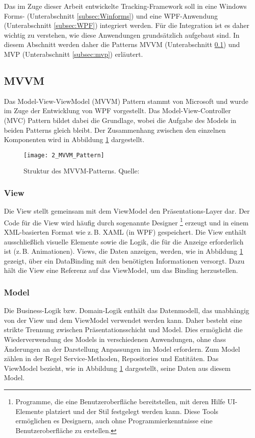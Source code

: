Das im Zuge dieser Arbeit entwickelte Tracking-Framework soll in eine Windows Forms- (Unterabschnitt \ref{subsec:Winforms}) und eine WPF-Anwendung (Unterabschnitt \ref{subsec:WPF}) integriert werden. 
Für die Integration ist es daher wichtig zu verstehen, wie diese Anwendungen grundsätzlich aufgebaut sind. 
In diesem Abschnitt werden daher die Patterns MVVM (Unterabschnitt \ref{subsec:mvvm}) und MVP (Unterabschnitt \ref{subsec:mvp}) erläutert.

\subsection{MVVM}
\label{subsec:mvvm}

Das Model-View-ViewModel (MVVM) Pattern stammt von Microsoft \cite{Gossman2005MVVM} und wurde im Zuge der Entwicklung von WPF vorgestellt. 
Das Model-View-Controller (MVC) Pattern \cite{Krasner1988MVC} bildet dabei die Grundlage, wobei die Aufgabe des Models in beiden Patterns gleich bleibt. 
Der Zusammenhang zwischen den einzelnen Komponenten wird in Abbildung \ref{fig:mvvm_pattern} dargestellt.

\begin{figure}[H]
    \centering
    \texttt{[image: 2\_MVVM\_Pattern]}
    \caption{Struktur des MVVM-Patterns. Quelle: \cite{Uncopy2024MVVMPattern}}
    \label{fig:mvvm_pattern}
\end{figure}

\subsubsection{View}
Die View stellt gemeinsam mit dem ViewModel den Präsentations-Layer dar. Der Code für die View wird häufig durch sogenannte Designer \footnote{Programme, die eine Benutzeroberfläche bereitstellen, mit deren Hilfe UI-Elemente platziert und der Stil festgelegt werden kann. 
Diese Tools ermöglichen es Designern, auch ohne Programmierkenntnisse eine Benutzeroberfläche zu erstellen.} erzeugt und in einem XML-basierten Format wie z.\,B. XAML (in WPF) gespeichert. Die View enthält ausschließlich visuelle Elemente sowie die Logik, die für die Anzeige erforderlich ist (z.\,B. Animationen). Views, die Daten anzeigen, werden, wie in Abbildung \ref{fig:mvvm_pattern} gezeigt, über ein DataBinding mit den benötigten Informationen versorgt. Dazu hält die View eine Referenz auf das ViewModel, um das Binding herzustellen.

\subsubsection{Model}
Die Business-Logik bzw. Domain-Logik enthält das Datenmodell, das unabhängig von der View und dem ViewModel verwendet werden kann. 
Daher besteht eine strikte Trennung zwischen Präsentationsschicht und Model. 
Dies ermöglicht die Wiederverwendung des Models in verschiedenen Anwendungen, ohne dass Änderungen an der Darstellung Anpassungen im Model erfordern. 
Zum Model zählen in der Regel Service-Methoden, Repositories und Entitäten. 
Das ViewModel bezieht, wie in Abbildung \ref{fig:mvvm_pattern} dargestellt, seine Daten aus diesem Model.

